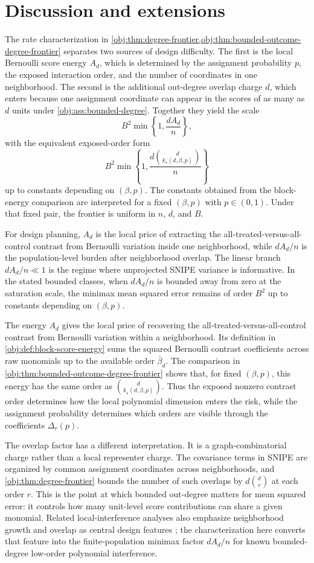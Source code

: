 \documentclass[11pt]{article}
\begin{document}
\section{Discussion and extensions}

The rate characterization in \cref{obj:thm:degree-frontier,obj:thm:bounded-outcome-degree-frontier} separates two sources of design difficulty. The first is the local Bernoulli score energy \(A_d\), which is determined by the assignment probability \(p\), the exposed interaction order, and the number of coordinates in one neighborhood. The second is the additional out-degree overlap charge \(d\), which enters because one assignment coordinate can appear in the scores of as many as \(d\) units under \cref{obj:ass:bounded-degree}. Together they yield the scale
\[
B^2\min\left\{1,\frac{dA_d}{n}\right\},
\]
with the equivalent exposed-order form
\[
B^2\min\left\{1,\frac{d\binom d{k_\star(d,\beta,p)}}{n}\right\}
\]
up to constants depending on \((\beta,p)\). The constants obtained from the block-energy comparison are interpreted for a fixed \((\beta,p)\) with \(p\in(0,1)\). Under that fixed pair, the frontier is uniform in \(n\), \(d\), and \(B\).

For design planning, \(A_d\) is the local price of extracting the all-treated-versus-all-control contrast from Bernoulli variation inside one neighborhood, while \(dA_d/n\) is the population-level burden after neighborhood overlap. The linear branch \(dA_d/n\ll1\) is the regime where unprojected SNIPE variance is informative. In the stated bounded classes, when \(dA_d/n\) is bounded away from zero at the saturation scale, the minimax mean squared error remains of order \(B^2\) up to constants depending on \((\beta,p)\).

The energy \(A_d\) gives the local price of recovering the all-treated-versus-all-control contrast from Bernoulli variation within a neighborhood. Its definition in \cref{obj:def:block-score-energy} sums the squared Bernoulli contrast coefficients across raw monomials up to the available order \(\bar\beta_d\). The comparison in \cref{obj:thm:bounded-outcome-degree-frontier} shows that, for fixed \((\beta,p)\), this energy has the same order as \(\binom d{k_\star(d,\beta,p)}\). Thus the exposed nonzero contrast order determines how the local polynomial dimension enters the risk, while the assignment probability determines which orders are visible through the coefficients \(\Delta_r(p)\).

The overlap factor has a different interpretation. It is a graph-combinatorial charge rather than a local representer charge. The covariance terms in SNIPE are organized by common assignment coordinates across neighborhoods, and \cref{obj:thm:degree-frontier} bounds the number of such overlaps by \(d\binom d r\) at each order \(r\). This is the point at which bounded out-degree matters for mean squared error: it controls how many unit-level score contributions can share a given monomial. Related local-interference analyses also emphasize neighborhood growth and overlap as central design features \citep{Savje2021,Leung2022,Hu2022,Gao2025}; the characterization here converts that feature into the finite-population minimax factor \(dA_d/n\) for known bounded-degree low-order polynomial interference.
\end{document}

